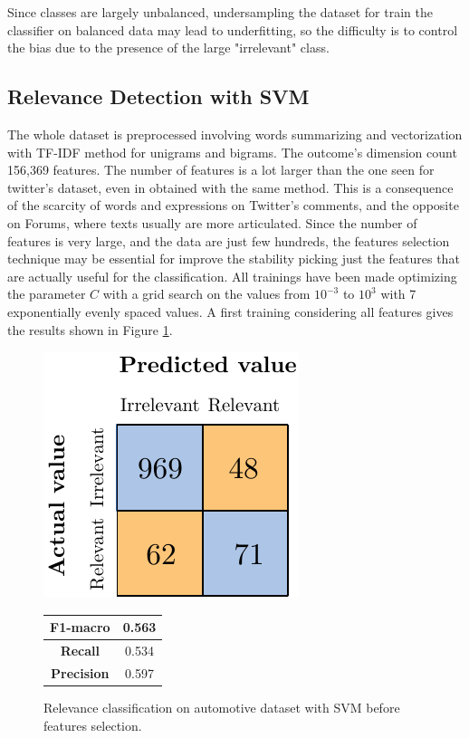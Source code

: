 Since classes are largely unbalanced, undersampling the dataset for train the classifier on balanced data may lead to underfitting, so the difficulty is to control the bias due to the presence of the large "irrelevant" class.



\subsection{Relevance Detection with SVM}

The whole dataset is preprocessed involving words summarizing and vectorization with TF-IDF method for unigrams and bigrams. The outcome's dimension count 156,369 features. The number of features is a lot larger than the one seen for twitter's dataset, even in obtained with the same method. This is a consequence of the scarcity of words and expressions on Twitter's comments, and the opposite on Forums, where texts usually are more articulated. Since the number of features is very large, and the data are just few hundreds, the features selection technique may be essential for improve the stability picking just the features that are actually useful for the classification. All trainings have been made optimizing the parameter $C$ with a grid search on the values from $10^{-3}$ to $10^3$ with 7 exponentially evenly spaced values. A first training considering all features gives the results shown in Figure \ref{fig:ita_rel_svm_bfs}.

\begin{figure}[H]
	\begin{minipage}[b]{0.6\linewidth}
		\centering
		\includegraphics[scale=1]{figures/conf_matrices/ita_rel_svm/ita_rel_svm_bfs.pdf}
	\end{minipage}
	\begin{minipage}[b]{0.3\linewidth}
		\begin{tabular}[b]{ | c | c | } 
			\hline
			\textbf{F1-macro} & 0.563 \\
			\hline
			\textbf{Recall} & 0.534 \\ 
			\hline
			\textbf{Precision} & 0.597 \\ 
			\hline
		\end{tabular}
	\end{minipage}
	\caption{Relevance classification on automotive dataset with SVM before features selection.}
	\label{fig:ita_rel_svm_bfs}
\end{figure}


